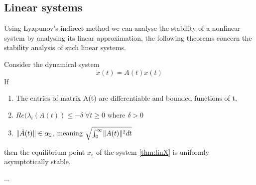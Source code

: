 \subsection{Linear systems}
Using Lyapunov's indirect method we can analyse the stability of a nonlinear system by analysing its linear approximation, the following theorems concern the stability analysis of such linear systems.
\thm{}
{
    Consider the dynamical system
             \begin{equation}
                \label{thm:linX}
                \dot{x}(t) = A(t)x(t)
            \end{equation}
     If 
     \begin{enumerate}
         \item The entries of matrix A(t) are differentiable and bounded functions of t,
        \item $Re(\lambda_i(A(t)) \le -\delta \; \forall t\ge 0$ where $\delta > 0$
        \item $\lVert\dot{A}(t)\rVert \in \alpha_2$, meaning $\sqrt{\int_0^\infty \lVert A(t)\rVert^2 dt}$
     \end{enumerate}
    then the equilibrium point $x_e$ of the system  \ref{thm:linX} is uniformly asymptotically stable.

    \ex{}
    {...}
}
\thm{}
